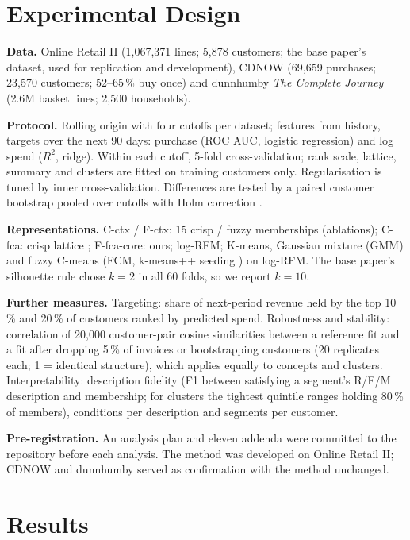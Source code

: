 \documentclass[conference]{IEEEtran}
\begin{document}
\section{Experimental Design}

\textbf{Data.} Online Retail II \cite{chen2019uci} (1,067,371 lines; 5,878 customers; the base paper's dataset, used for replication and development), CDNOW \cite{fader2005} (69,659 purchases; 23,570 customers; 52--65\,\% buy once) and dunnhumby \emph{The Complete Journey} \cite{dunnhumby} (2.6M basket lines; 2,500 households).

\textbf{Protocol.} Rolling origin \cite{tashman2000} with four cutoffs per dataset; features from history, targets over the next 90 days: purchase (ROC AUC, logistic regression) and log spend ($R^2$, ridge). Within each cutoff, 5-fold cross-validation; rank scale, lattice, summary and clusters are fitted on training customers only. Regularisation is tuned by inner cross-validation. Differences are tested by a paired customer bootstrap pooled over cutoffs \cite{efron1993} with Holm correction \cite{holm1979}.

\textbf{Representations.} C-ctx / F-ctx: 15 crisp / fuzzy memberships (ablations); C-fca: crisp lattice \cite{rungruang2024}; F-fca-core: ours; log-RFM; K-means, Gaussian mixture (GMM) and fuzzy C-means (FCM, k-means++ seeding \cite{arthur2007}) on log-RFM. The base paper's silhouette rule \cite{rousseeuw1987} chose $k=2$ in all 60 folds, so we report $k=10$.

\textbf{Further measures.} Targeting: share of next-period revenue held by the top 10\,\% and 20\,\% of customers ranked by predicted spend. Robustness and stability: correlation of 20,000 customer-pair cosine similarities between a reference fit and a fit after dropping 5\,\% of invoices or bootstrapping customers (20 replicates each; 1 = identical structure), which applies equally to concepts and clusters. Interpretability: description fidelity (F1 between satisfying a segment's R/F/M description and membership; for clusters the tightest quintile ranges holding 80\,\% of members), conditions per description and segments per customer.

\textbf{Pre-registration.} An analysis plan and eleven addenda were committed to the repository before each analysis. The method was developed on Online Retail II; CDNOW and dunnhumby served as confirmation with the method unchanged.

\section{Results}
\end{document}
